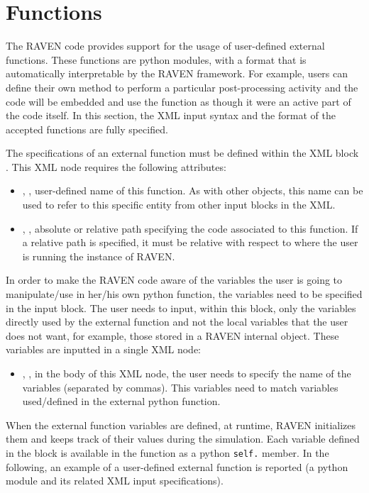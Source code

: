 \section{Functions}
\label{sec:functions}




The RAVEN code provides support for the usage of user-defined external
functions.
%
These functions are python modules, with a format that is automatically
interpretable by the RAVEN framework.
%
For example, users can define their own method to perform a particular
post-processing activity and the code will be embedded and use the function as
though it were an active part of the code itself.
%
In this section, the XML input syntax and the format of the accepted functions
are fully specified.

The specifications of an external function must be defined within the XML block
.
%
This XML node requires the following attributes:
\vspace{-5mm}
\begin{itemize}
  \itemsep0em
  \item {}, , user-defined name
  of this function.
  \nb As with other objects, this name can be used to refer to this
  specific entity from other input blocks in the XML.
  \item {}, , absolute or
  relative path specifying the code associated to this function.
  \nb If a relative path is specified, it must be relative with respect
  to where the user is running the instance of RAVEN.
\end{itemize}
\vspace{-5mm}
In order to make the RAVEN code aware of the variables the user is going to
manipulate/use in her/his own python function, the variables need to be
specified in the  input block.
%
The user needs to input, within this block, only the variables directly used by
the external function and not the local variables that the user does not want,
for example, those stored in a RAVEN internal object.
%
These variables are inputted in a single
 XML node:
\begin{itemize}
  \item {}, , in the body of
  this XML node, the user needs to specify the name of the variables (separated by commas).
  This variables need to match variables used/defined in the external python
  function.
\end{itemize}
When the external function variables are defined, at runtime, RAVEN initializes
them and keeps track of their values during the simulation.
%
Each variable defined in the  block is available in the
function as a python \texttt{self.} member. In the following, an example of a
user-defined external function is reported (a python module and its related XML
input specifications).

